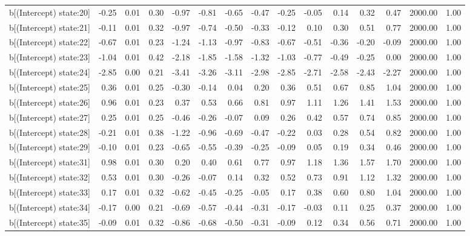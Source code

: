 \begin{table}[ht]
\begin{tabular}{rrrrrrrrrrrrrrr}
  b[(Intercept) state:20] & -0.25 & 0.01 & 0.30 & -0.97 & -0.81 & -0.65 & -0.47 & -0.25 & -0.05 & 0.14 & 0.32 & 0.47 & 2000.00 & 1.00 \\ 
  b[(Intercept) state:21] & -0.11 & 0.01 & 0.32 & -0.97 & -0.74 & -0.50 & -0.33 & -0.12 & 0.10 & 0.30 & 0.51 & 0.77 & 2000.00 & 1.00 \\ 
  b[(Intercept) state:22] & -0.67 & 0.01 & 0.23 & -1.24 & -1.13 & -0.97 & -0.83 & -0.67 & -0.51 & -0.36 & -0.20 & -0.09 & 2000.00 & 1.00 \\ 
  b[(Intercept) state:23] & -1.04 & 0.01 & 0.42 & -2.18 & -1.85 & -1.58 & -1.32 & -1.03 & -0.77 & -0.49 & -0.25 & 0.00 & 2000.00 & 1.00 \\ 
  b[(Intercept) state:24] & -2.85 & 0.00 & 0.21 & -3.41 & -3.26 & -3.11 & -2.98 & -2.85 & -2.71 & -2.58 & -2.43 & -2.27 & 2000.00 & 1.00 \\ 
  b[(Intercept) state:25] & 0.36 & 0.01 & 0.25 & -0.30 & -0.14 & 0.04 & 0.20 & 0.36 & 0.51 & 0.67 & 0.85 & 1.04 & 2000.00 & 1.00 \\ 
  b[(Intercept) state:26] & 0.96 & 0.01 & 0.23 & 0.37 & 0.53 & 0.66 & 0.81 & 0.97 & 1.11 & 1.26 & 1.41 & 1.53 & 2000.00 & 1.00 \\ 
  b[(Intercept) state:27] & 0.25 & 0.01 & 0.25 & -0.46 & -0.26 & -0.07 & 0.09 & 0.26 & 0.42 & 0.57 & 0.74 & 0.85 & 2000.00 & 1.00 \\ 
  b[(Intercept) state:28] & -0.21 & 0.01 & 0.38 & -1.22 & -0.96 & -0.69 & -0.47 & -0.22 & 0.03 & 0.28 & 0.54 & 0.82 & 2000.00 & 1.00 \\ 
  b[(Intercept) state:29] & -0.10 & 0.01 & 0.23 & -0.65 & -0.55 & -0.39 & -0.25 & -0.09 & 0.05 & 0.19 & 0.34 & 0.46 & 2000.00 & 1.00 \\ 
  b[(Intercept) state:31] & 0.98 & 0.01 & 0.30 & 0.20 & 0.40 & 0.61 & 0.77 & 0.97 & 1.18 & 1.36 & 1.57 & 1.70 & 2000.00 & 1.00 \\ 
  b[(Intercept) state:32] & 0.53 & 0.01 & 0.30 & -0.26 & -0.07 & 0.14 & 0.32 & 0.52 & 0.73 & 0.91 & 1.12 & 1.32 & 2000.00 & 1.00 \\ 
  b[(Intercept) state:33] & 0.17 & 0.01 & 0.32 & -0.62 & -0.45 & -0.25 & -0.05 & 0.17 & 0.38 & 0.60 & 0.80 & 1.04 & 2000.00 & 1.00 \\ 
  b[(Intercept) state:34] & -0.17 & 0.00 & 0.21 & -0.69 & -0.57 & -0.44 & -0.31 & -0.17 & -0.03 & 0.11 & 0.25 & 0.37 & 2000.00 & 1.00 \\ 
  b[(Intercept) state:35] & -0.09 & 0.01 & 0.32 & -0.86 & -0.68 & -0.50 & -0.31 & -0.09 & 0.12 & 0.34 & 0.56 & 0.71 & 2000.00 & 1.00 \\ 

\end{tabular}
\end{table}
